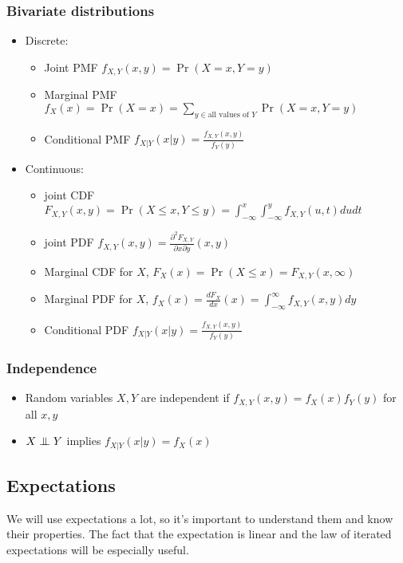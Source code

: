 \begin{frame}
  \frametitle{Bivariate distributions}
  \begin{itemize}
  \item Discrete: 
    \begin{itemize}
    \item Joint PMF $f_{X,Y}(x,y) = \Pr(X = x, Y = y)$
    \item Marginal PMF $f_X(x) = \Pr(X = x) = \sum_{y \in \text{all values
          of } Y} \Pr(X=x,Y=y)$
    \item Conditional PMF $f_{X|Y}(x|y) = \frac{f_{X,Y}(x,y)}{f_Y(y)}$
    \end{itemize}
  \item Continuous: 
    \begin{itemize}
    \item joint CDF $F_{X,Y}(x,y) = \Pr(X \leq x, Y \leq y) =
      \int_{-\infty}^x \int_{-\infty}^y f_{X,Y}(u,t) du dt$ 
    \item joint PDF $f_{X,Y}(x,y) = \frac{\partial^2 F_{X,Y}}{\partial
        x \partial y}(x,y)$
    \item Marginal CDF for $X$, $F_X(x) = \Pr(X \leq x) =
      F_{X,Y}(x,\infty)$
    \item Marginal PDF for $X$, $f_X(x) = \frac{d F_X}{dx}(x) =
      \int_{-\infty}^\infty f_{X,Y}(x,y) dy$
    \item Conditional PDF $f_{X|Y}(x|y) = \frac{f_{X,Y}(x,y)}{f_Y(y)}$
    \end{itemize}    
  \end{itemize}
\end{frame}

\begin{frame}
  \frametitle{Independence}
  \begin{itemize}
  \item Random variables $X,Y$ are independent if $f_{X,Y}(x,y) =
    f_X(x) f_Y(y)$ for all $x,y$
  \item $X \indep Y$ implies $f_{X|Y}(x|y) = f_X(x)$
  \end{itemize}
\end{frame}

\subsection{Expectations}

We will use expectations a lot, so it's important to understand them
and know their properties. The fact that the expectation is linear and
the law of iterated expectations will be especially useful.  

